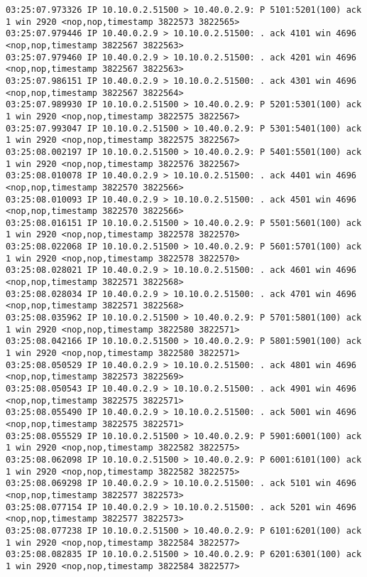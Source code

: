 \documentclass[a4paper,12pt]{article}
\begin{document}
\begin{lstlisting}
03:25:07.973326 IP 10.10.0.2.51500 > 10.40.0.2.9: P 5101:5201(100) ack 1 win 2920 <nop,nop,timestamp 3822573 3822565>
03:25:07.979446 IP 10.40.0.2.9 > 10.10.0.2.51500: . ack 4101 win 4696 <nop,nop,timestamp 3822567 3822563>
03:25:07.979460 IP 10.40.0.2.9 > 10.10.0.2.51500: . ack 4201 win 4696 <nop,nop,timestamp 3822567 3822563>
03:25:07.986151 IP 10.40.0.2.9 > 10.10.0.2.51500: . ack 4301 win 4696 <nop,nop,timestamp 3822567 3822564>
03:25:07.989930 IP 10.10.0.2.51500 > 10.40.0.2.9: P 5201:5301(100) ack 1 win 2920 <nop,nop,timestamp 3822575 3822567>
03:25:07.993047 IP 10.10.0.2.51500 > 10.40.0.2.9: P 5301:5401(100) ack 1 win 2920 <nop,nop,timestamp 3822575 3822567>
03:25:08.002197 IP 10.10.0.2.51500 > 10.40.0.2.9: P 5401:5501(100) ack 1 win 2920 <nop,nop,timestamp 3822576 3822567>
03:25:08.010078 IP 10.40.0.2.9 > 10.10.0.2.51500: . ack 4401 win 4696 <nop,nop,timestamp 3822570 3822566>
03:25:08.010093 IP 10.40.0.2.9 > 10.10.0.2.51500: . ack 4501 win 4696 <nop,nop,timestamp 3822570 3822566>
03:25:08.016151 IP 10.10.0.2.51500 > 10.40.0.2.9: P 5501:5601(100) ack 1 win 2920 <nop,nop,timestamp 3822578 3822570>
03:25:08.022068 IP 10.10.0.2.51500 > 10.40.0.2.9: P 5601:5701(100) ack 1 win 2920 <nop,nop,timestamp 3822578 3822570>
03:25:08.028021 IP 10.40.0.2.9 > 10.10.0.2.51500: . ack 4601 win 4696 <nop,nop,timestamp 3822571 3822568>
03:25:08.028034 IP 10.40.0.2.9 > 10.10.0.2.51500: . ack 4701 win 4696 <nop,nop,timestamp 3822571 3822568>
03:25:08.035962 IP 10.10.0.2.51500 > 10.40.0.2.9: P 5701:5801(100) ack 1 win 2920 <nop,nop,timestamp 3822580 3822571>
03:25:08.042166 IP 10.10.0.2.51500 > 10.40.0.2.9: P 5801:5901(100) ack 1 win 2920 <nop,nop,timestamp 3822580 3822571>
03:25:08.050529 IP 10.40.0.2.9 > 10.10.0.2.51500: . ack 4801 win 4696 <nop,nop,timestamp 3822573 3822569>
03:25:08.050543 IP 10.40.0.2.9 > 10.10.0.2.51500: . ack 4901 win 4696 <nop,nop,timestamp 3822575 3822571>
03:25:08.055490 IP 10.40.0.2.9 > 10.10.0.2.51500: . ack 5001 win 4696 <nop,nop,timestamp 3822575 3822571>
03:25:08.055529 IP 10.10.0.2.51500 > 10.40.0.2.9: P 5901:6001(100) ack 1 win 2920 <nop,nop,timestamp 3822582 3822575>
03:25:08.062098 IP 10.10.0.2.51500 > 10.40.0.2.9: P 6001:6101(100) ack 1 win 2920 <nop,nop,timestamp 3822582 3822575>
03:25:08.069298 IP 10.40.0.2.9 > 10.10.0.2.51500: . ack 5101 win 4696 <nop,nop,timestamp 3822577 3822573>
03:25:08.077154 IP 10.40.0.2.9 > 10.10.0.2.51500: . ack 5201 win 4696 <nop,nop,timestamp 3822577 3822573>
03:25:08.077238 IP 10.10.0.2.51500 > 10.40.0.2.9: P 6101:6201(100) ack 1 win 2920 <nop,nop,timestamp 3822584 3822577>
03:25:08.082835 IP 10.10.0.2.51500 > 10.40.0.2.9: P 6201:6301(100) ack 1 win 2920 <nop,nop,timestamp 3822584 3822577>

\end{lstlisting}
\end{document}
